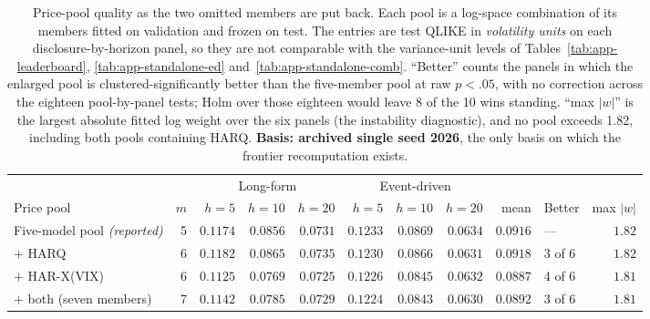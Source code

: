 \begin{table}[htbp]
\centering
\caption[Price-pool quality as the frontier is completed]{Price-pool
quality as the two omitted members are put back. Each pool is a log-space
combination of its members fitted on validation and frozen on test. The
entries are test QLIKE in \emph{volatility units} on each
disclosure-by-horizon panel, so they are not comparable with the
variance-unit levels of Tables~\ref{tab:app-leaderboard},
\ref{tab:app-standalone-ed} and~\ref{tab:app-standalone-comb}. ``Better''
counts the panels in which the enlarged pool is clustered-significantly
better than the five-member pool at raw $p<.05$, with no correction across the
eighteen pool-by-panel tests; Holm over those eighteen would leave 8 of the 10
wins standing.
``max $|w|$'' is the largest absolute
fitted log weight over the six panels (the instability diagnostic),
and no pool exceeds 1.82, including both pools containing HARQ.
\textbf{Basis: archived single seed 2026}, the only basis on which the
frontier recomputation exists.}
\label{tab:app-pool-quality}
\singlespacing\small
\setlength{\tabcolsep}{3.5pt}
\begin{tabular}{@{}lrrrrrrrrlr@{}}
\toprule
& & \multicolumn{3}{c}{Long-form} & \multicolumn{3}{c}{Event-driven} & & & \\
\cmidrule(lr){3-5}\cmidrule(lr){6-8}
Price pool & $m$ & $h{=}5$ & $h{=}10$ & $h{=}20$ & $h{=}5$ & $h{=}10$ & $h{=}20$ & mean & Better & max $|w|$ \\
\midrule
Five-model pool \emph{(reported)} & 5 & $0.1174$ & $0.0856$ & $0.0731$ & $0.1233$ & $0.0869$ & $0.0634$ & $0.0916$ & --- & $1.82$ \\
\quad $+$ HARQ & 6 & $0.1182$ & $0.0865$ & $0.0735$ & $0.1230$ & $0.0866$ & $0.0631$ & $0.0918$ & 3 of 6 & $1.82$ \\
\quad $+$ HAR-X(VIX) & 6 & $0.1125$ & $0.0769$ & $0.0725$ & $0.1226$ & $0.0845$ & $0.0632$ & $0.0887$ & 4 of 6 & $1.81$ \\
\quad $+$ both (seven members) & 7 & $0.1142$ & $0.0785$ & $0.0729$ & $0.1224$ & $0.0843$ & $0.0630$ & $0.0892$ & 3 of 6 & $1.81$ \\
\bottomrule
\end{tabular}
\end{table}

